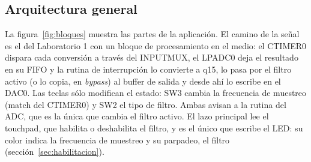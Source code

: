 \documentclass[11pt,a4paper]{article}
\begin{document}
\label{sec:diseno}

\subsection{Arquitectura general}

La figura~\ref{fig:bloques} muestra las partes de la aplicación. El camino de
la señal es el del Laboratorio 1 con un bloque de procesamiento en el medio:
el CTIMER0 dispara cada conversión a través del INPUTMUX, el LPADC0 deja el
resultado en su FIFO y la rutina de interrupción lo convierte a q15, lo pasa
por el filtro activo (o lo copia, en \emph{bypass}) al buffer de salida y
desde ahí lo escribe en el DAC0. Las teclas sólo modifican el estado: SW3 cambia la frecuencia de
muestreo (match del CTIMER0) y SW2 el tipo de filtro. Ambas avisan a la
rutina del ADC, que es la única que cambia el filtro activo. El lazo
principal lee el touchpad, que habilita o deshabilita el filtro, y es el
único que escribe el LED: su color indica la frecuencia de muestreo y su
parpadeo, el filtro (sección~\ref{sec:habilitacion}).
\end{document}
